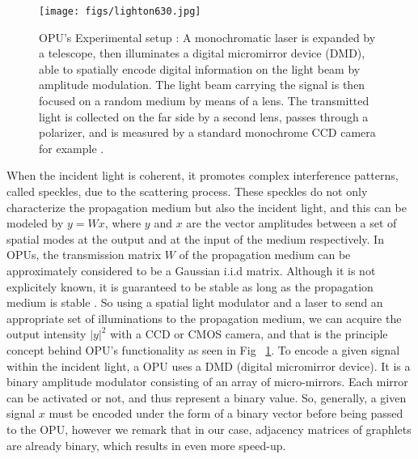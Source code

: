 \begin{figure}[ht!]
\begin{center}
\texttt{[image: figs/lighton630.jpg]}
\end{center}
\caption[OPU's Experimental setup]{OPU's Experimental setup \citep{saade_opu}: A monochromatic laser is expanded by a telescope, then
illuminates a digital micromirror device (DMD), able to spatially encode digital information on the light beam by
amplitude modulation. The light beam carrying the signal is then focused on a random
medium by means of a lens. The transmitted light is collected on the
far side by a second lens, passes through a polarizer, and is measured by a standard monochrome CCD camera for example .}
\label{fig_opu}
\end{figure}
When the incident light is coherent, it promotes complex interference patterns, called speckles, due to the scattering process.
These speckles do not only characterize the propagation medium but also the incident light, and this can be modeled by $y=Wx$, 
where $y$ and $x$ are the vector amplitudes between a set of spatial modes at the output and at the input of the medium respectively. In OPUs, the transmission matrix $W$ of the propagation medium can be approximately considered to be a Gaussian i.i.d matrix. Although it is not explicitely known, it is guaranteed to be stable as long as the propagation medium is stable \citep{saade_opu}.  So using a spatial light modulator and a laser to send an appropriate set of illuminations to the propagation medium, we can acquire the output intensity $|y|^2$ with a CCD or CMOS camera, and that is the principle concept behind OPU's functionality as seen in Fig~ \ref{fig_opu}. To encode a given signal within the incident light, a OPU uses a DMD (digital micromirror device). It is a binary amplitude modulator consisting of an array of micro-mirrors. Each mirror can be activated or not, and thus represent a binary value. %
So, generally, a given signal $x$ must be encoded under the form of a binary vector before being passed to the OPU, however we remark that in our case, adjacency matrices of graphlets are already binary, which results in even more speed-up. %


